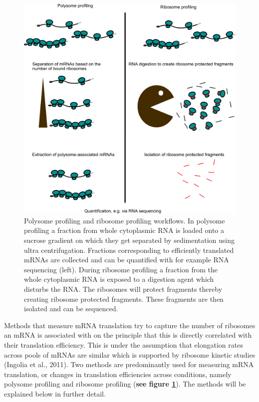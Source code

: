 \documentclass[12pt,openany]{book}
\begin{document}
\begin{figure}
    \includegraphics{./figures/polyRibo.pdf}
  \caption{Polysome profiling and ribosome profiling workflows. In polysome profiling a fraction from whole cytoplasmic RNA is loaded onto a sucrose gradient on which they get separated by sedimentation using ultra centrifugation. Fractions corresponding to efficiently translated mRNAs are collected and can be quantified with for example RNA sequencing (left). During ribosome profiling a fraction from the whole cytoplasmic RNA is exposed to a digestion agent which disturbs the RNA. The ribosomes will protect fragments thereby creating ribosome protected fragments. These fragments are then isolated and can be sequenced.  \label{fig:polyRibo}}
\end{figure}

Methods that measure mRNA translation try to capture the number of
ribosomes an mRNA is associated with on the principle that this is
directly correlated with their translation efficiency. This is under the
assumption that elongation rates across pools of mRNAs are similar which
is supported by ribosome kinetic studies (Ingolia et al., 2011). Two
methods are predominantly used for measuring mRNA translation, or
changes in translation efficiencies across conditions, namely polysome
profiling and ribosome profiling (\textbf{see figure
\ref{fig:polyRibo}}). The methods will be explained below in further
detail.
\end{document}

